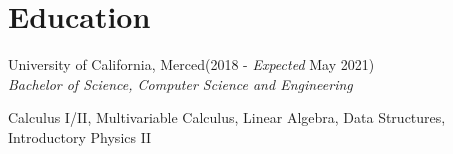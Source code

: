 \documentclass[./Resume.tex]{subfiles}
\begin{document}
\section{Education}
University of California, Merced\null\hfill(2018 - \emph{Expected} May 2021)\\
		   \emph{Bachelor of Science, Computer Science and Engineering}
		   \begin{center}
			   Calculus I/II, Multivariable Calculus, Linear Algebra, Data Structures, Introductory Physics II
		   \end{center}
\end{document}
